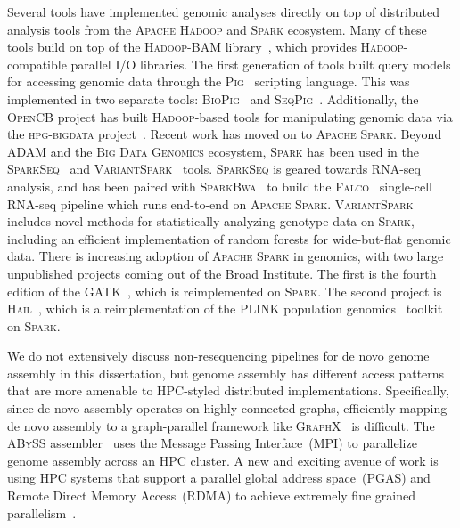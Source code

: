 \documentclass[phd]{ucbthesis}
\begin{document}
Several tools have implemented genomic analyses directly on top of distributed
analysis tools from the \textsc{Apache Hadoop} and \textsc{Spark} ecosystem.
Many of these tools build on top of the \textsc{Hadoop-BAM}
library~\cite{niemenmaa12}, which provides \textsc{Hadoop}-compatible parallel
I/O libraries. The first generation of tools built query models for accessing
genomic data through the \textsc{Pig}~\cite{olston08} scripting language.
This was implemented in two separate tools: \textsc{BioPig}~\cite{nordberg13}
and \textsc{SeqPig}~\cite{schumacher14}. Additionally, the \textsc{OpenCB}
project has built \textsc{Hadoop}-based tools for manipulating genomic data via
the \textsc{hpg-bigdata} project~\cite{opencb}. Recent work has moved on to
\textsc{Apache Spark}. Beyond \textsc{ADAM} and the \textsc{Big Data Genomics}
ecosystem, \textsc{Spark} has been used in the
\textsc{SparkSeq}~\cite{wiewiorka14} and \textsc{VariantSpark}~\cite{obrien15}
tools. \textsc{SparkSeq} is geared towards RNA-seq analysis, and has been
paired with \textsc{SparkBwa}~\cite{abuin16} to build the
\textsc{Falco}~\cite{yang16} single-cell RNA-seq pipeline which runs end-to-end
on \textsc{Apache Spark}. \textsc{VariantSpark} includes novel methods for
statistically analyzing genotype data on \textsc{Spark}, including an efficient
implementation of random forests for wide-but-flat genomic data. There is
increasing adoption of \textsc{Apache Spark} in genomics, with two large
unpublished projects coming out of the Broad Institute. The first is the fourth
edition of the \textsc{GATK}~\cite{gatk4}, which is reimplemented on
\textsc{Spark}. The second project is \textsc{Hail}~\cite{hail}, which is a
reimplementation of the \textsc{PLINK} population genomics~\cite{purcell07}
toolkit on \textsc{Spark}.

We do not extensively discuss non-resequencing pipelines for de novo genome
assembly in this dissertation, but genome assembly has different access patterns
that are more amenable to HPC-styled distributed implementations. Specifically,
since de novo assembly operates on highly connected graphs, efficiently mapping
de novo assembly to a graph-parallel framework like
\textsc{GraphX}~\cite{gonzalez14} is difficult. The \textsc{ABySS}
assembler~\cite{simpson09} uses the Message Passing Interface~(MPI) to
parallelize genome assembly across an HPC cluster. A new and exciting avenue
of work is using HPC systems that support a parallel global address space~(PGAS)
and Remote Direct Memory Access~(RDMA) to achieve extremely fine grained
parallelism~\cite{georganas14, georganas15hipmer, georganas15meraligner,
  georganas17}.
\end{document}
